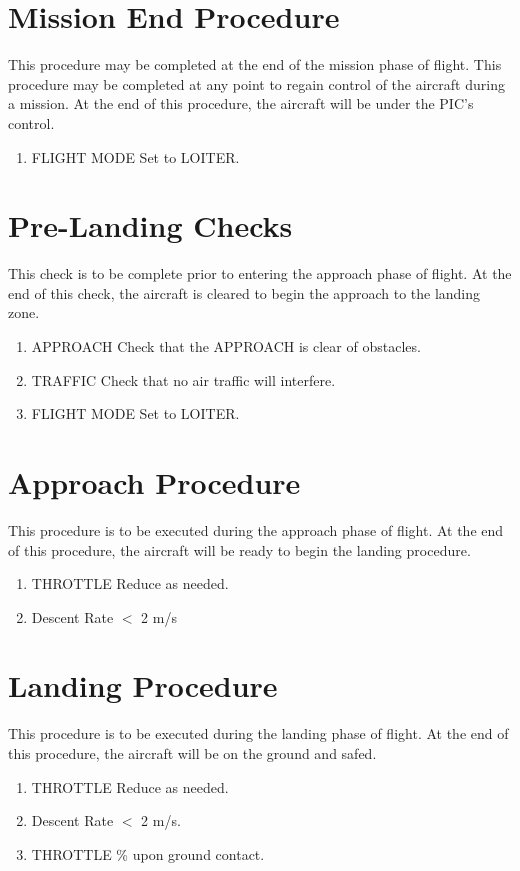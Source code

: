 \documentclass{report}
\begin{document}
	\section{Mission End Procedure}
		This procedure may be completed at the end of the mission phase of flight.  This procedure may be completed at any point to regain control of the aircraft during a mission.  At the end of this procedure, the aircraft will be under the \gls{PIC}'s control.
		\begin{enumerate}
			\item FLIGHT MODE \hrulefill Set to LOITER.
		\end{enumerate}
	\section{Pre-Landing Checks}
		This check is to be complete prior to entering the approach phase of flight.  At the end of this check, the aircraft is cleared to begin the approach to the landing zone.
		\begin{enumerate}
			\item APPROACH \hrulefill Check that the APPROACH is clear of obstacles.
			\item TRAFFIC \hrulefill Check that no air traffic will interfere.
			\item FLIGHT MODE \hrulefill Set to LOITER.
		\end{enumerate}
	\section{Approach Procedure}
		This procedure is to be executed during the approach phase of flight.  At the end of this procedure, the aircraft will be ready to begin the landing procedure.
		\begin{enumerate}
			\item THROTTLE \hrulefill Reduce as needed.
			\item Descent Rate \hrulefill $<$ 2 m/s
		\end{enumerate}
	\section{Landing Procedure}
		This procedure is to be executed during the landing phase of flight.  At the end of this procedure, the aircraft will be on the ground and safed.
		\begin{enumerate}
			\item THROTTLE \hrulefill Reduce as needed.
			\item Descent Rate \hrulefill $<$ 2 m/s.
			\item THROTTLE \% upon ground contact.
		\end{enumerate}
\end{document}
